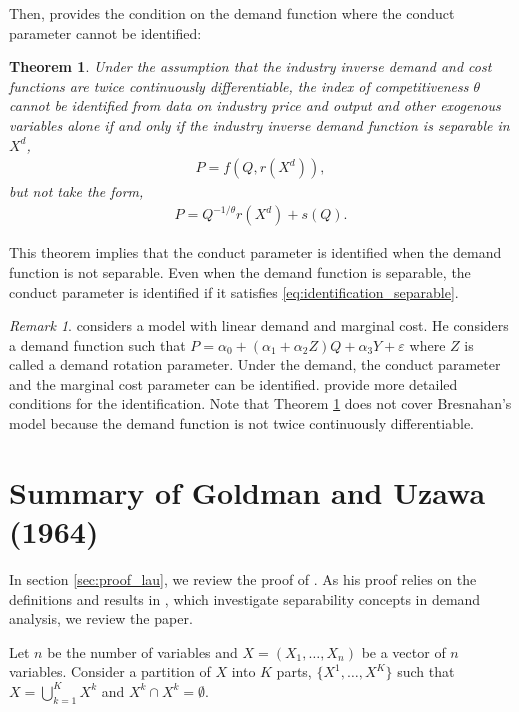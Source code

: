 \documentclass[11pt, a4paper]{article}
\newtheorem{theorem}{Theorem}
\theoremstyle{remark}
\newtheorem{remark}{Remark}
\begin{document}
Then, \citet{lau1982identifying} provides the condition on the demand function where the conduct parameter cannot be identified:
\begin{theorem}\label{theorem_lau}
    Under the assumption that the industry inverse demand and cost functions are twice continuously differentiable, the index of competitiveness $\theta$ cannot be identified from data on industry price and output and other exogenous variables alone if and only if the industry inverse demand function is separable in $X^{d}$, 
    \begin{align}
        P = f(Q, r(X^{d})), \label{eq:demand_separable}
    \end{align}
    but not take the form, 
    \begin{align}
        P = Q^{-1/\theta}r(X^{d}) + s(Q). \label{eq:identification_separable}
    \end{align}
\end{theorem}
This theorem implies that the conduct parameter is identified when the demand function is not separable.
Even when the demand function is separable, the conduct parameter is identified if it satisfies \eqref{eq:identification_separable}.

\begin{remark}
    \citet{bresnahan1982oligopoly} considers a model with linear demand and marginal cost.
    He considers a demand function such that $P = \alpha_0 + (\alpha_1 + \alpha_2 Z) Q + \alpha_3 Y + \varepsilon$ where $Z$ is called a demand rotation parameter.
    Under the demand, the conduct parameter and the marginal cost parameter can be identified.
    \citet{matsumura2023resolving} provide more detailed conditions for the identification.
    Note that Theorem \ref{theorem_lau} does not cover Bresnahan's model because the demand function is not twice continuously differentiable.
\end{remark}

\section{Summary of Goldman and Uzawa (1964)}

In section \ref{sec:proof_lau}, we review the proof of \citet{lau1982identifying}.
As his proof relies on the definitions and results in \citet{goldmanNote1964}, which investigate separability concepts in demand analysis, we review the paper.

Let $n$ be the number of variables and $X = (X_{1},\ldots, X_{n})$ be a vector of $n$ variables.
Consider a partition of $X$ into $K$ parts, $\{X^1, \ldots, X^K\}$ such that $X = \bigcup_{k=1}^K X^k$ and $X^k \cap X^k = \emptyset$.
\end{document}
